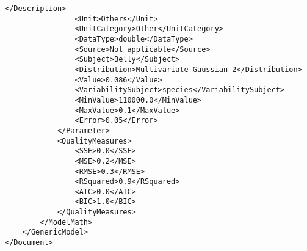 \documentclass[a4paper]{report}
\begin{document}
\begin{lstlisting}[language=RAKIP, caption={Example of StudySample}]
                </Description>
                <Unit>Others</Unit>
                <UnitCategory>Other</UnitCategory>
                <DataType>double</DataType>
                <Source>Not applicable</Source>
                <Subject>Belly</Subject>
                <Distribution>Multivariate Gaussian 2</Distribution>
                <Value>0.086</Value>
                <VariabilitySubject>species</VariabilitySubject>
                <MinValue>110000.0</MinValue>
                <MaxValue>0.1</MaxValue>
                <Error>0.05</Error>
            </Parameter>
            <QualityMeasures>
                <SSE>0.0</SSE>
                <MSE>0.2</MSE>
                <RMSE>0.3</RMSE>
                <RSquared>0.9</RSquared>
                <AIC>0.0</AIC>
                <BIC>1.0</BIC>
            </QualityMeasures>
        </ModelMath>
    </GenericModel>
</Document>    
\end{lstlisting}
\end{document}
